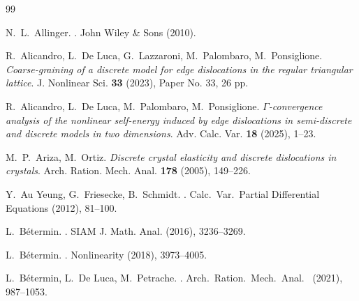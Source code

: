 \documentclass[reqno]{amsart}
\theoremstyle{plain}
\theoremstyle{definition}
\numberwithin{equation}{section}
\begin{document}
 




 
\begin{thebibliography}{99}
%




 {\sc   N.~L.~Allinger}.
.
\newblock John Wiley \& Sons
\newblock (2010).



  {\sc   R.~Alicandro, L.~De Luca, G.~Lazzaroni, M.~Palombaro,
    M.~Ponsiglione}.
  {\em Coarse-graining of a discrete model for
    edge dislocations in the regular triangular lattice}.
  J. Nonlinear Sci. {\bf 33} (2023),   Paper No. 33, 26 pp.
  
  {\sc   R.~Alicandro, L.~De Luca, M.~Palombaro, M.~Ponsiglione}.
  {\em $\Gamma$-convergence analysis of the nonlinear self-energy
    induced by edge dislocations in semi-discrete and discrete models
    in two dimensions}. Adv. Calc. Var. {\bf 18} (2025),   1--23.

  {\sc M.~P.~Ariza, M.~Ortiz}.
  {\em Discrete crystal elasticity and discrete dislocations in
    crystals}.
  Arch. Ration. Mech. Anal. {\bf 178} (2005), 149--226.






 

 


 {\sc   Y.~Au Yeung, G.~Friesecke, B.~Schmidt}.
.
\newblock Calc.\ Var.\ Partial Differential Equations
 (2012), 81--100.


{\sc L.~B\'etermin}.
.
\newblock SIAM J. Math. Anal.
 (2016),  
 3236--3269.

{\sc L.~B\'etermin}.
.
\newblock Nonlinearity
 (2018),   3973--4005.

 
 
{\sc L.~B\'etermin, L.~De Luca, M.~Petrache}.
.  
\newblock Arch.\ Ration.\ Mech.\ Anal.\
 (2021), 987--1053.




\end{thebibliography}
\end{document}
